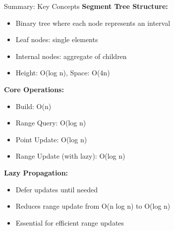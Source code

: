 \documentclass[aspectratio=169]{beamer}
\begin{document}
\begin{frame}{Summary: Key Concepts}
  \textbf{Segment Tree Structure:}
  \begin{itemize}
    \item Binary tree where each node represents an interval
    \item Leaf nodes: single elements
    \item Internal nodes: aggregate of children
    \item Height: O(log n), Space: O(4n)
  \end{itemize}

  \vspace{0.5cm}
  \textbf{Core Operations:}
  \begin{itemize}
    \item Build: O(n)
    \item Range Query: O(log n)
    \item Point Update: O(log n)
    \item Range Update (with lazy): O(log n)
  \end{itemize}

  \vspace{0.5cm}
  \textbf{Lazy Propagation:}
  \begin{itemize}
    \item Defer updates until needed
    \item Reduces range update from O(n log n) to O(log n)
    \item Essential for efficient range updates
  \end{itemize}
\end{frame}
\end{document}
